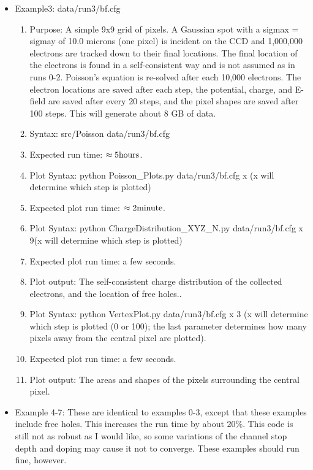 \documentclass{article} %
\begin{document}
\begin{itemize}
      \item Example3: data/run3/bf.cfg
    \begin{enumerate}
      \item Purpose: A simple 9x9 grid of pixels.  A Gaussian spot with a sigmax = sigmay of 10.0 microns (one pixel) is incident on the CCD and 1,000,000 electrons are tracked down to their final locations. The final location of the electrons is found in a self-consistent way and is not assumed as in runs 0-2.  Poisson's equation is re-solved after each 10,000 electrons.  The electron locations are saved after each step, the potential, charge, and E-field are saved after every 20 steps, and the pixel shapes are saved after 100 steps. This will generate about 8 GB of data.
      \item Syntax: src/Poisson data/run3/bf.cfg
      \item Expected run time: $\rm \approx 5 hours$.
      \item Plot Syntax: python Poisson\_Plots.py data/run3/bf.cfg x (x will determine which step is plotted)
      \item Expected plot run time: $\rm \approx 2 minute$.
      \item Plot Syntax: python ChargeDistribution\_XYZ\_N.py data/run3/bf.cfg x 9(x will determine which step is plotted)
      \item Expected plot run time: a few seconds.
      \item Plot output: The self-consistent charge distribution of the collected electrons, and the location of free holes..
      \item Plot Syntax: python VertexPlot.py data/run3/bf.cfg x 3 (x will determine which step is plotted (0 or 100); the last parameter determines how many pixels away from the central pixel are plotted).
      \item Expected plot run time: a few seconds.
      \item Plot output: The areas and shapes of the pixels surrounding the central pixel.

    \end{enumerate}

      \item Example 4-7:  These are identical to examples 0-3, except that these examples include free holes.  This increases the run time by about 20\%.  This code is still not as robust as I would like, so some variations of the channel stop depth and doping may cause it not to converge.  These examples should run fine, however.


\end{itemize}
\end{document}

